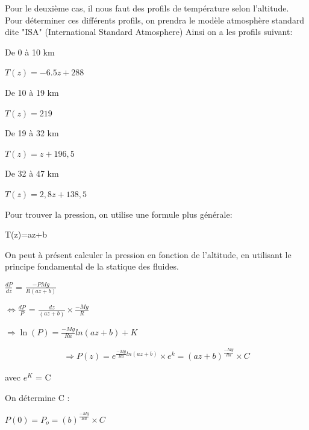 \documentclass[a4paper, 12pt]{report} %
\begin{document}
Pour le deuxième cas, il nous faut des profils de température selon l'altitude. Pour déterminer ces différents profils, on prendra le modèle atmosphère standard dite "ISA" (International Standard Atmosphere)
Ainsi on a les profils suivant:

De 0 à 10 km 
\begin{center}
    $T(z)=-6.5z+288$
\end{center}

De 10 à 19 km 
\begin{center}
    $T(z)=219$
\end{center}

De 19 à 32 km 
\begin{center}
    $T(z)=z+196,5$
\end{center}

De 32 à 47 km 
\begin{center}
    $T(z)=2,8z+138,5$
\end{center}

\noindent Pour trouver la pression, on utilise une formule plus générale:
\begin{center}
T(z)=az+b      
\end{center}

On peut à présent calculer la pression en fonction de l'altitude, en utilisant le principe fondamental de la statique des fluides. 
\begin{center}
     $\frac{dP}{dz}$ = $\frac{-{P} Mg}{R(az+b)}$ 
\end{center}

\begin{center}
$\Leftrightarrow \frac{dP}{P}$ = $\frac{dz}{(az+b)} \times \frac{- Mg}{R}$
\end{center}

\begin{center}
     $\Rightarrow \ln(P)=\frac{-Mg}{Ra} ln(az+b)+K$\\
\end{center}

\begin{align*}
     \Rightarrow P(z) = e^{\frac{-Mg}{Ra}ln(az+b)} \times e^k =(az+b)^{\frac{-Mg}{Ra}} \times C
\end{align*}

avec $e^{K}$ = C \vspace{\baselineskip}

On détermine C :
\begin{center}
$P(0)= P_o = (b)^{\frac{-Mg}{Ra}} \times C$
\end{center}
\end{document}
